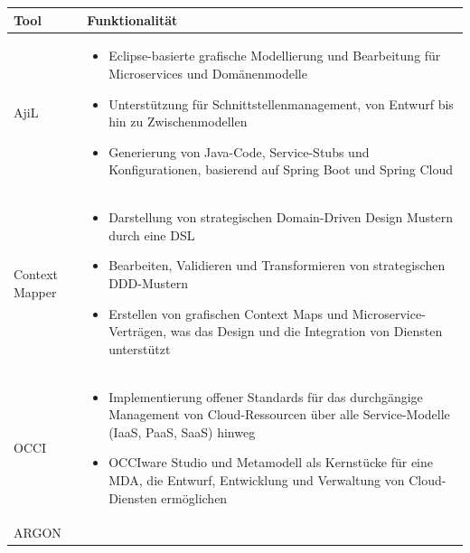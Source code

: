 {\begin{table}[h]
\centering
\begin{tabularx}{\textwidth}{|p{}|X|}
\hline
Tool & Funktionalität \\
\hline
AjiL \cite{rademacher} & 
\begin{itemize}[leftmargin=*, nosep, before=\vspace{-0.6\baselineskip}, after=\vspace{-\baselineskip}]
	\item Eclipse-basierte grafische Modellierung und Bearbeitung für Microservices und Domänenmodelle
	\item Unterstützung für Schnittstellenmanagement, von Entwurf bis hin zu Zwischenmodellen
	\item Generierung von Java-Code, Service-Stubs und Konfigurationen, basierend auf Spring Boot und Spring Cloud
\end{itemize} \\
\hline
Context Mapper \cite{mapper} & 
\begin{itemize}[leftmargin=*, nosep, before=\vspace{-0.6\baselineskip}, after=\vspace{-\baselineskip}]
    \item Darstellung von strategischen Domain-Driven Design Mustern durch eine DSL
    \item Bearbeiten, Validieren und Transformieren von strategischen DDD-Mustern
    \item Erstellen von grafischen Context Maps und Microservice-Verträgen, was das Design und die Integration von Diensten unterstützt
\end{itemize} \\
\hline
OCCI \cite{zalila} & 
\begin{itemize}[leftmargin=*, nosep, before=\vspace{-0.6\baselineskip}, after=\vspace{-\baselineskip}]
	\item Implementierung offener Standards für das durchgängige Management von Cloud-Ressourcen über alle Service-Modelle (IaaS, PaaS, SaaS) hinweg
	\item OCCIware Studio und Metamodell als Kernstücke für eine MDA, die Entwurf, Entwicklung und Verwaltung von Cloud-Diensten ermöglichen
\end{itemize} \\
\hline
ARGON \cite{argon} & 
\begin{itemize}[leftmargin=*, nosep, before=\vspace{-0.6\baselineskip}, after=\vspace{-\baselineskip}]

\end{itemize}
\end{tabularx}
\end{table}}
